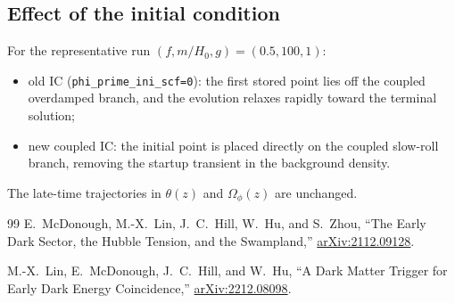 \documentclass[aps,onecolumn,prd,nofootinbib,superscriptaddress,10pt,longbibliography,floatfix]{revtex4-2}
\begin{document}
\subsection{Effect of the initial condition}
For the representative run $(f,m/H_0,g)=(0.5,100,1)$:
\begin{itemize}
\item old IC (\texttt{phi\_prime\_ini\_scf=0}): the first stored point lies off the coupled overdamped branch, and the evolution relaxes rapidly toward the terminal solution;
\item new coupled IC: the initial point is placed directly on the coupled slow-roll branch, removing the startup transient in the background density.
\end{itemize}
The late-time trajectories in $\theta(z)$ and $\Omega_\phi(z)$ are unchanged.

\begin{thebibliography}{99}
E.~McDonough, M.-X.~Lin, J.~C.~Hill, W.~Hu, and S.~Zhou,
``The Early Dark Sector, the Hubble Tension, and the Swampland,''
\href{https://arxiv.org/abs/2112.09128}{arXiv:2112.09128}.

M.-X.~Lin, E.~McDonough, J.~C.~Hill, and W.~Hu,
``A Dark Matter Trigger for Early Dark Energy Coincidence,''
\href{https://arxiv.org/abs/2212.08098}{arXiv:2212.08098}.
\end{thebibliography}
\end{document}
